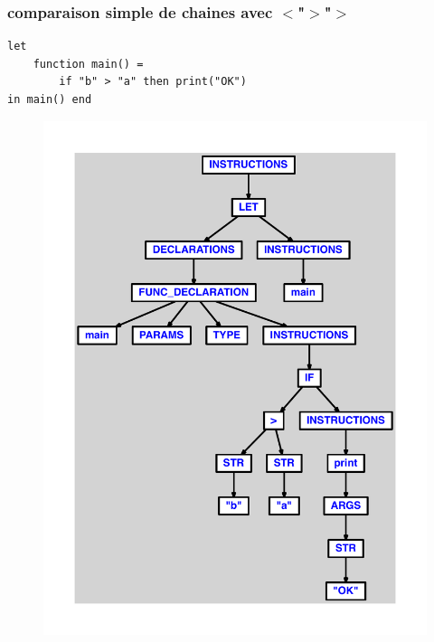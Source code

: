\documentclass{article}
\begin{document}
\subsubsection{comparaison simple de chaines avec $ < $"$ > $"$ > $}
\begin{lstlisting}
let
	function main() =
		if "b" > "a" then print("OK")
in main() end
\end{lstlisting}
\newpage
\begin{figure}[H]
\centering
\includegraphics[max width=\textwidth]{ast/ast_176.pdf}
\end{figure}
\newpage
\end{document}
